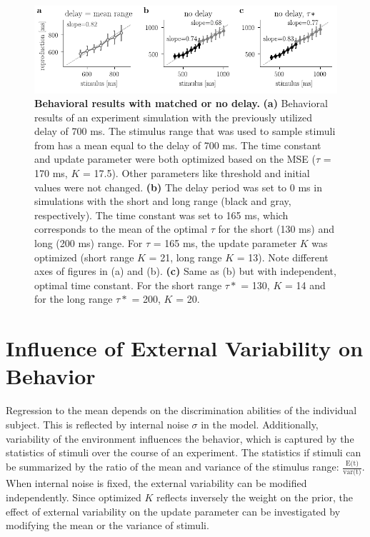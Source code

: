 \documentclass[10pt]{article}
\begin{document}
\begin{figure}[ht]
	\centering
	\includegraphics{figures/delay.pdf}
	\caption{\textbf{Behavioral results with matched or no delay.} 
	\textbf{(a)} Behavioral results of an experiment simulation with the previously utilized delay of 700 ms. The stimulus range that was used to sample stimuli from has a mean equal to the delay of 700 ms. The time constant and update parameter were both optimized based on the MSE ($\tau$ = 170 ms, $K$ = 17.5). Other parameters like threshold and initial values were not changed. 
	\textbf{(b)} The delay period was set to 0 ms in simulations with the short and long range (black and gray, respectively). The time constant was set to 165 ms, which corresponds to the mean of the optimal $\tau$ for the short (130 ms) and long (200 ms) range. For $\tau$ = 165 ms, the update parameter $K$ was optimized (short range $K$ = 21, long range $K$ = 13). Note different axes of figures in (a) and (b).
	\textbf{(c)} Same as (b) but with independent, optimal time constant. For the short range $\tau*$ = 130, $K$ = 14 and for the long range $\tau*$ = 200, $K$ = 20.
	}
\label{fig:delay}
\end{figure}

\section{Influence of External Variability on Behavior} \label{externalvar}
Regression to the mean depends on the discrimination abilities of the individual subject. This is reflected by internal noise $\sigma$ in the model.
Additionally, variability of the environment influences the behavior, which is captured  by the statistics of stimuli over the course of an experiment. 
The statistics if stimuli can be summarized by the ratio of the mean and variance of the stimulus range: $\frac{\text{E(t)}}{\text{var(t)}}$.
When internal noise is fixed, the external variability can be modified independently. 
Since optimized $K$ reflects inversely the weight on the prior, the effect of external variability on the update parameter can be investigated by modifying the mean or the variance of stimuli. 
\end{document}
